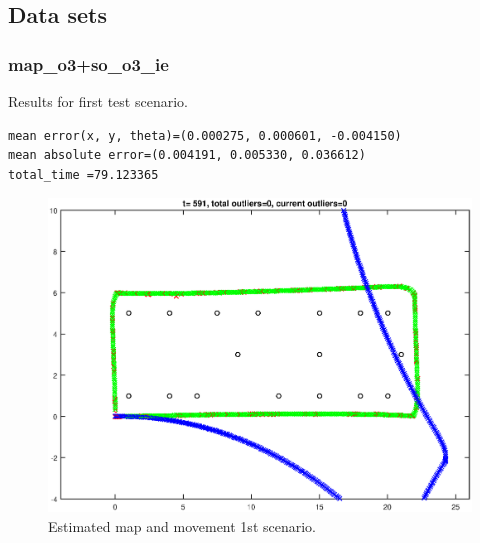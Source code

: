 \documentclass[12pt]{article}
\begin{document}
\subsection{Data sets}
\subsubsection*{map\_o3+so\_o3\_ie}
Results for first test scenario.

\begin{verbatim}
mean error(x, y, theta)=(0.000275, 0.000601, -0.004150)
mean absolute error=(0.004191, 0.005330, 0.036612)
total_time =79.123365
\end{verbatim}

\begin{figure}[htbp]
 \centering
 \includegraphics[width=\textwidth]{test1_fig1}
 \caption{Estimated map and movement 1st scenario.}
\end{figure}
\end{document}

